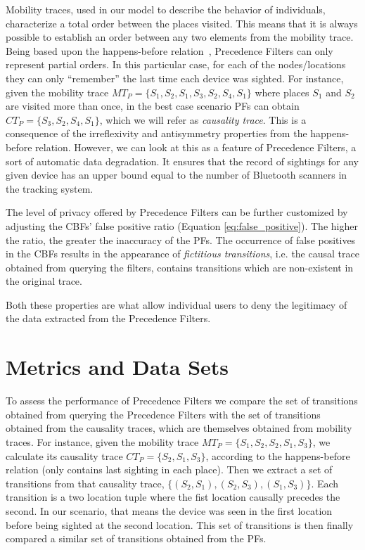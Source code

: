 Mobility traces, used in our model to describe the behavior of
individuals, characterize a total order between the places
visited. This means that it is always possible to establish an order
between any two elements from the mobility trace. Being based upon the
happens-before relation~\cite{Lamport:1978}, Precedence Filters can
only represent partial orders. In this particular case, for each of
the nodes/locations they can only ``remember'' the last time each
device was sighted. For instance, given the mobility trace
$MT_{P}=\{S_1,S_2,S_1,S_3,S_2,S_4,S_1\}$ where places $S_1$ and $S_2$
are visited more than once, in the best case scenario PFs can obtain
$CT_{P}=\{S_3,S_2,S_4,S_1\}$, which we will refer as \emph{causality
 trace}. This is a consequence of the irreflexivity and antisymmetry
properties from the happens-before relation. However, we can look at
this as a feature of Precedence Filters, a sort of automatic data
degradation. It ensures that the record of sightings for any given
device has an upper bound equal to the number of Bluetooth scanners in
the tracking system.

The level of privacy offered by Precedence Filters can be further
customized by adjusting the CBFs' false positive ratio (Equation
\ref{eq:false_positive}). The higher the ratio, the greater the
inaccuracy of the PFs. The occurrence of false positives in the CBFs
results in the appearance of \emph{fictitious transitions}, i.e. the
causal trace obtained from querying the filters, contains transitions
which are non-existent in the original trace. 

Both these properties are what allow individual users to deny the
legitimacy of the data extracted from the Precedence Filters.


\section{Metrics and Data Sets}
\label{sec:metrics-data-sets}

To assess the performance of Precedence Filters we compare the set of
transitions obtained from querying the Precedence Filters with the set
of transitions obtained from the causality traces, which are themselves
obtained from mobility traces.  For instance, given the mobility trace
$MT_P=\{S_1,S_2,S_2,S_1,S_3\}$, we calculate its causality trace
$CT_P=\{S_2,S_1,S_3\}$, according to the happens-before relation (only
contains last sighting in each place). Then we extract a set of
transitions from that causality trace,
$\{(S_2,S_1),(S_2,S_3),(S_1,S_3)\}$. Each transition is a two location
tuple where the fist location causally precedes the second. In our
scenario, that means the device was seen in the first location
before being sighted at the second location. This
set of transitions is then finally compared a similar set of
transitions obtained from the PFs.



